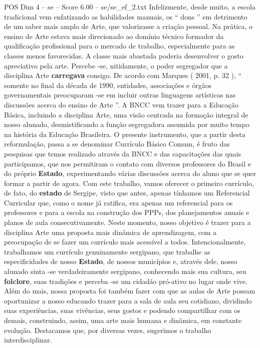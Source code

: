 \begin{textsample}{POS Dim 4 – se – Score 6.00 – se/se\_ef\_2.txt}
Infelizmente, desde muito, a escola tradicional vem enfatizando as habilidades manuais, os “ dons ” em detrimento de um saber mais amplo de Arte, que valorizasse a criação pessoal.
Na prática, o ensino de Arte estava mais direcionado ao domínio técnico formador da qualificação profissional para o mercado de trabalho, especialmente para as classes menos favorecidas.
A classe mais abastada poderia desenvolver o gosto apreciativo pela arte.
Percebe -se, nitidamente, o poder segregador que a disciplina Arte \textbf{carregava} consigo.
De acordo com Marques ( 2001, p. 32 ), “ somente no final da década de 1990, entidades, associações e órgãos governamentais preocuparam -se em incluir outras linguagens artísticas nas discussões acerca do ensino de Arte ”.
A BNCC vem trazer para a Educação Básica, incluindo a disciplina Arte, uma visão centrada na formação integral de nosso alunado, desmistificando a função segregadora assumida por muito tempo na história da Educação Brasileira.
O presente instrumento, que a partir desta reformulação, passa a se denominar Currículo Básico Comum, é fruto das pesquisas que temos realizado através da BNCC e das capacitações das quais participamos, que nos permitiram o contato com diversos professores do Brasil e do próprio \textbf{Estado}, experimentando várias discussões acerca do aluno que se quer formar a partir de agora.
Com este trabalho, vamos oferecer o primeiro currículo, de fato, do \textbf{estado} de Sergipe, visto que antes, apenas tínhamos um Referencial Curricular que, como o nome já ratifica, era apenas um referencial para os professores e para a escola na construção dos PPPs, dos planejamentos anuais e planos de aula consecutivamente.
Neste momento, nosso objetivo é trazer para a disciplina Arte uma proposta mais dinâmica de aprendizagem, com a preocupação de se fazer um currículo mais acessível a todos.
Intencionalmente, trabalhamos um currículo genuinamente sergipano, que trabalhe as especificidades de nosso \textbf{Estado}, de nossos municípios e, através dele, nosso alunado sinta -se verdadeiramente sergipano, conhecendo mais sua cultura, seu \textbf{folclore}, suas tradições e perceba -se um cidadão pró-ativo no lugar onde vive.
Além do mais, nossa proposta foi também fazer com que as aulas de Arte possam oportunizar a nosso educando trazer para a sala de aula seu cotidiano, dividindo suas experiências, suas vivências, seus gostos e podendo compartilhar com os demais, construindo, assim, uma arte mais humana e dinâmica, em constante evolução.
Destacamos que, por diversas vezes, sugerimos o trabalho interdisciplinar.

\end{textsample}
